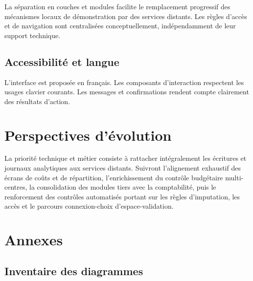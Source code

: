 \documentclass[12pt,a4paper]{report}
\begin{document}
La séparation en couches et modules facilite le remplacement progressif des mécanismes locaux de démonstration par des services distants. Les règles d'accès et de navigation sont centralisées conceptuellement, indépendamment de leur support technique.

\section{Accessibilité et langue}

L'interface est proposée en français. Les composants d'interaction respectent les usages clavier courants. Les messages et confirmations rendent compte clairement des résultats d'action.

\chapter{Perspectives d'évolution}

La priorité technique et métier consiste à rattacher intégralement les écritures et journaux analytiques aux services distants. Suivront l'alignement exhaustif des écrans de coûts et de répartition, l'enrichissement du contrôle budgétaire multi-centres, la consolidation des modules tiers avec la comptabilité, puis le renforcement des contrôles automatisés portant sur les règles d'imputation, les accès et le parcours connexion-choix d'espace-validation.

\chapter{Annexes}

\section{Inventaire des diagrammes}
\end{document}
